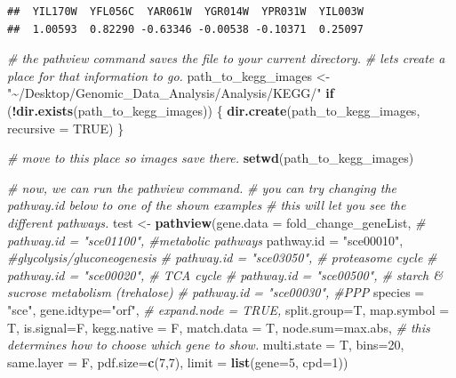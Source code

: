 \documentclass[
]{book}
\newenvironment{Shaded}{\begin{snugshade}}{\end{snugshade}}
\newcommand{\AttributeTok}[1]{\textcolor[rgb]{0.13,0.29,0.53}{#1}}
\newcommand{\CommentTok}[1]{\textcolor[rgb]{0.56,0.35,0.01}{\textit{#1}}}
\newcommand{\ConstantTok}[1]{\textcolor[rgb]{0.56,0.35,0.01}{#1}}
\newcommand{\ControlFlowTok}[1]{\textcolor[rgb]{0.13,0.29,0.53}{\textbf{#1}}}
\newcommand{\DecValTok}[1]{\textcolor[rgb]{0.00,0.00,0.81}{#1}}
\newcommand{\FunctionTok}[1]{\textcolor[rgb]{0.13,0.29,0.53}{\textbf{#1}}}
\newcommand{\NormalTok}[1]{#1}
\newcommand{\OtherTok}[1]{\textcolor[rgb]{0.56,0.35,0.01}{#1}}
\newcommand{\SpecialCharTok}[1]{\textcolor[rgb]{0.81,0.36,0.00}{\textbf{#1}}}
\newcommand{\StringTok}[1]{\textcolor[rgb]{0.31,0.60,0.02}{#1}}
\begin{document}
\begin{verbatim}
##  YIL170W  YFL056C  YAR061W  YGR014W  YPR031W  YIL003W 
##  1.00593  0.82290 -0.63346 -0.00538 -0.10371  0.25097
\end{verbatim}

\begin{Shaded}
\begin{Highlighting}[]
\CommentTok{\# the pathview command saves the file to your current directory.}
\CommentTok{\# let\textquotesingle{}s create a place for that information to go.}
\NormalTok{path\_to\_kegg\_images }\OtherTok{\textless{}{-}} \StringTok{"\textasciitilde{}/Desktop/Genomic\_Data\_Analysis/Analysis/KEGG/"}
\ControlFlowTok{if}\NormalTok{ (}\SpecialCharTok{!}\FunctionTok{dir.exists}\NormalTok{(path\_to\_kegg\_images)) \{}
  \FunctionTok{dir.create}\NormalTok{(path\_to\_kegg\_images, }\AttributeTok{recursive =} \ConstantTok{TRUE}\NormalTok{)}
\NormalTok{\}}

\CommentTok{\# move to this place so images save there.}
\FunctionTok{setwd}\NormalTok{(path\_to\_kegg\_images)}

\CommentTok{\# now, we can run the pathview command.}
\CommentTok{\# you can try changing the pathway.id below to one of the shown examples}
\CommentTok{\# this will let you see the different pathways.}
\NormalTok{test }\OtherTok{\textless{}{-}} \FunctionTok{pathview}\NormalTok{(}\AttributeTok{gene.data  =}\NormalTok{ fold\_change\_geneList,}
                     \CommentTok{\# pathway.id = "sce01100", \#metabolic pathways}
                     \AttributeTok{pathway.id =} \StringTok{"sce00010"}\NormalTok{, }\CommentTok{\#glycolysis/gluconeogenesis}
                     \CommentTok{\# pathway.id = "sce03050", \# proteasome cycle}
                     \CommentTok{\# pathway.id = "sce00020", \# TCA cycle}
                     \CommentTok{\# pathway.id = "sce00500", \# starch \& sucrose metabolism (trehalose)}
                     \CommentTok{\# pathway.id = "sce00030", \#PPP}
                     \AttributeTok{species    =} \StringTok{"sce"}\NormalTok{,}
                     \AttributeTok{gene.idtype=}\StringTok{"orf"}\NormalTok{,}
                     \CommentTok{\# expand.node = TRUE,}
                     \AttributeTok{split.group=}\NormalTok{T,}
                     \AttributeTok{map.symbol =}\NormalTok{ T,}
                     \AttributeTok{is.signal=}\NormalTok{F,}
                     \AttributeTok{kegg.native =}\NormalTok{ F, }
                     \AttributeTok{match.data =}\NormalTok{ T, }
                     \AttributeTok{node.sum=}\StringTok{\textquotesingle{}max.abs\textquotesingle{}}\NormalTok{, }\CommentTok{\# this determines how to choose which gene to show.}
                     \AttributeTok{multi.state =}\NormalTok{ T, }
                     \AttributeTok{bins=}\DecValTok{20}\NormalTok{,}
                     \AttributeTok{same.layer =}\NormalTok{ F,}
                     \AttributeTok{pdf.size=}\FunctionTok{c}\NormalTok{(}\DecValTok{7}\NormalTok{,}\DecValTok{7}\NormalTok{),}
                     \AttributeTok{limit =} \FunctionTok{list}\NormalTok{(}\AttributeTok{gene=}\DecValTok{5}\NormalTok{, }\AttributeTok{cpd=}\DecValTok{1}\NormalTok{))}
\end{Highlighting}
\end{Shaded}
\end{document}

